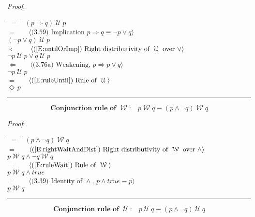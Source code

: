 \documentclass[12pt, fleqn, leqno]{article}
\newcommand{\lgap}{2pt}                             %
\newcommand{\mymathindent}{24pt}                    %
\newcommand{\impl}{\ensuremath{\Rightarrow}}        %
\newcommand{\foll}{\ensuremath{\Leftarrow}}         %
\newcommand{\Until}{\;\mathcal{U}\;}
\newcommand{\Wait}{\;\mathcal{W}\;}
\newcommand{\Event}{\Diamond\,}
\newcommand{\myqed}{\rule[-.23ex]{1.2ex}{2.0ex}}
\newcommand{\myqedtab}{\hspace{384pt}}              %
\newcommand{\Gll} {\langle}                         %
\newcommand{\Ggg} {\rangle}                         %
\newcommand{\Hint}[1]     {\ \ \ $\Gll              \mbox{#1} \Ggg$ }   %
\begin{document}
\emph{Proof}:
\begin{tabbing}
\hspace{\mymathindent} \= $= \;$ \= \myqedtab \= \kill
\> \> $(p\impl q)\Until p$\\[\lgap]
\> $=$ \> \Hint{(3.59) Implication $p\impl q\equiv \neg p\lor q$} \\[\lgap]
\> \> $(\neg p\lor q)\Until p$\\[\lgap]
\> $\foll$ \> \Hint{(\ref{E:untilOrImp}) Right distributivity of $\Until$ over $\lor$} \\[\lgap]
\> \> $\neg p \Until p\lor q\Until p$\\[\lgap]
\> $\foll$ \> \Hint{(3.76a) Weakening, $p\impl p\lor q$} \\[\lgap]
\> \> $\neg p \Until p$\\[\lgap]
\> $=$ \> \Hint{(\ref{E:ruleUntil}) Rule of $\Until$} \\[\lgap]
\> \> $\Event p$ \quad \myqed
\end{tabbing}
\begin{equation}\label{E:conRuleWait}
\textbf{Conjunction rule of $\Wait$:}\quad p\Wait q\equiv (p\land \neg q)\Wait q
\end{equation}

\emph{Proof}:
\begin{tabbing}
\hspace{\mymathindent} \= $= \;$ \= \myqedtab \= \kill
\> \> $(p\land \neg q) \Wait q$\\[\lgap]
\> $=$ \> \Hint{(\ref{E:rightWaitAndDist}) Right distributivity of $\Wait$ over $\land$} \\[\lgap]
\> \> $p\Wait q\land \neg q\Wait q$\\[\lgap]
\> $=$ \> \Hint{(\ref{E:ruleWait}) Rule of $\Wait$} \\[\lgap]
\> \> $p\Wait q\land true$\\[\lgap]
\> $=$ \> \Hint{(3.39) Identity of $\land$, $p\land true \equiv p$} \\[\lgap]
\> \> $p\Wait q$ \quad \myqed
\end{tabbing}
\begin{equation}\label{E:conRuleUntil}
\textbf{Conjunction rule of $\Until$:}\quad p\Until q\equiv (p\land \neg q)\Until q
\end{equation}
\end{document}

